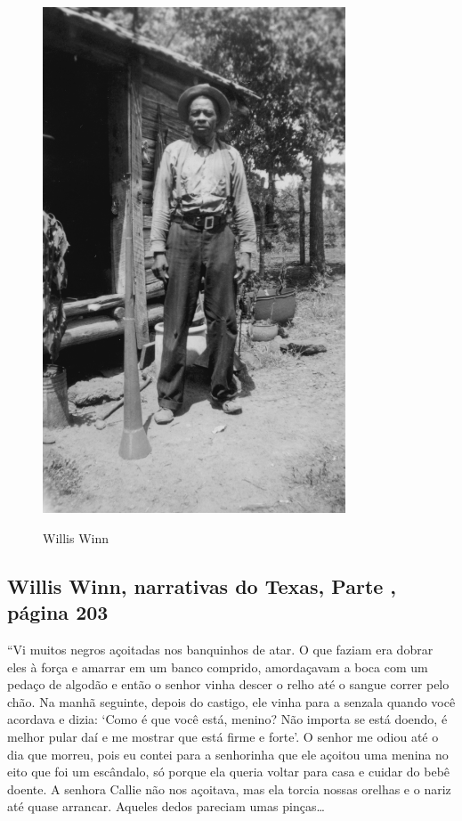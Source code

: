 \begin{figure}[]
\centering
 \includegraphics[width=90mm]{./imgs/williswill_recorte.jpg} \label{img9}
\caption{Willis Winn}
\end{figure}

\subsection{Willis Winn, narrativas do Texas, Parte , página 203}
\label{ref303}

``Vi muitos negros açoitadas nos banquinhos de atar. O que faziam era
dobrar eles à força e amarrar em um banco comprido, amordaçavam a boca
com um pedaço de algodão e então o senhor vinha descer o relho até o
sangue correr pelo chão. Na manhã seguinte, depois do castigo, ele vinha
para a senzala quando você acordava e dizia: `Como é que você está,
menino? Não importa se está doendo, é melhor pular daí e me mostrar que
está firme e forte'. O senhor me odiou até o dia que morreu, pois eu
contei para a senhorinha que ele açoitou uma menina no eito que foi um
escândalo, só porque ela queria voltar para casa e cuidar do bebê
doente. A senhora Callie não nos açoitava, mas ela torcia nossas orelhas
e o nariz até quase arrancar. Aqueles dedos pareciam umas pinças\ldots{}

